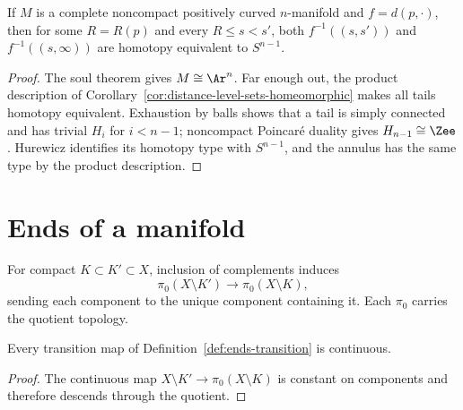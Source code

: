 \begin{corollary}
\label{cor:distance-annuli-homotopy-sphere}
\label{htpytype}

If $M$ is a complete noncompact positively curved $n$-manifold and
$f=d(p,\cdot)$, then for some $R=R(p)$ and every $R\le s<s'$, both
$f^{-1}((s,s'))$ and $f^{-1}((s,\infty))$ are homotopy equivalent to
$S^{n-1}$.
\end{corollary}
\begin{proof}
\sketch
{}
The soul theorem gives $M\cong\Ar^n$. Far enough out, the product
description of Corollary~\ref{cor:distance-level-sets-homeomorphic}
makes all tails homotopy equivalent. Exhaustion by balls shows that a
tail is simply connected and has trivial $H_i$ for $i<n-1$; noncompact
Poincar\'e duality gives $H_{n-1}\cong\Zee$. Hurewicz identifies its
homotopy type with $S^{n-1}$, and the annulus has the same type by the
product description.
\end{proof}

\section{Ends of a manifold}
\label{ENDS}

\begin{definition}
\label{def:ends-transition}
\leanok



For compact $K\subset K'\subset X$, inclusion of complements induces
$$\pi_0(X\setminus K')\longrightarrow\pi_0(X\setminus K),$$
sending each component to the unique component containing it. Each
$\pi_0$ carries the quotient topology.
\end{definition}

\begin{lemma}
\label{lem:ends-transition-continuous}
\leanok



Every transition map of Definition~\ref{def:ends-transition} is
continuous.
\end{lemma}
\begin{proof}
\sketch
\leanok
The continuous map $X\setminus K'\to\pi_0(X\setminus K)$ is constant
on components and therefore descends through the quotient.
\end{proof}

